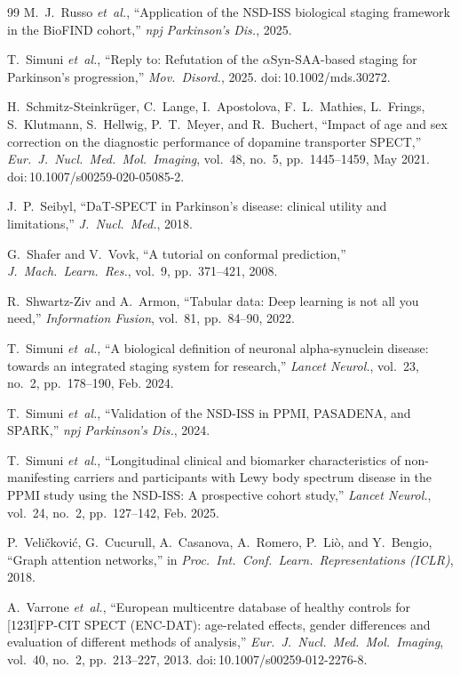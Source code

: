 \begin{thebibliography}{99}
M.~J.~Russo \textit{et~al.}, ``Application of the NSD-ISS biological staging framework in the BioFIND cohort,'' \textit{npj Parkinson's Dis.}, 2025.

T.~Simuni \textit{et~al.}, ``Reply to: Refutation of the $\alpha$Syn-SAA-based staging for Parkinson's progression,'' \textit{Mov.\ Disord.}, 2025. doi:\,10.1002/mds.30272.

H.~Schmitz-Steinkr\"{u}ger, C.~Lange, I.~Apostolova, F.~L.~Mathies, L.~Frings, S.~Klutmann, S.~Hellwig, P.~T.~Meyer, and R.~Buchert, ``Impact of age and sex correction on the diagnostic performance of dopamine transporter SPECT,'' \textit{Eur.\ J.\ Nucl.\ Med.\ Mol.\ Imaging}, vol.~48, no.~5, pp.~1445--1459, May 2021. doi:\,10.1007/s00259-020-05085-2.

J.~P.~Seibyl, ``DaT-SPECT in Parkinson's disease: clinical utility and limitations,'' \textit{J.\ Nucl.\ Med.}, 2018.

G.~Shafer and V.~Vovk, ``A tutorial on conformal prediction,'' \textit{J.\ Mach.\ Learn.\ Res.}, vol.~9, pp.~371--421, 2008.

R.~Shwartz-Ziv and A.~Armon, ``Tabular data: Deep learning is not all you need,'' \textit{Information Fusion}, vol.~81, pp.~84--90, 2022.

T.~Simuni \textit{et~al.}, ``A biological definition of neuronal alpha-synuclein disease: towards an integrated staging system for research,'' \textit{Lancet Neurol.}, vol.~23, no.~2, pp.~178--190, Feb. 2024.

T.~Simuni \textit{et~al.}, ``Validation of the NSD-ISS in PPMI, PASADENA, and SPARK,'' \textit{npj Parkinson's Dis.}, 2024.

T.~Simuni \textit{et~al.}, ``Longitudinal clinical and biomarker characteristics of non-manifesting carriers and participants with Lewy body spectrum disease in the PPMI study using the NSD-ISS: A prospective cohort study,'' \textit{Lancet Neurol.}, vol.~24, no.~2, pp.~127--142, Feb. 2025.

P.~Veli\v{c}kovi\'{c}, G.~Cucurull, A.~Casanova, A.~Romero, P.~Li\`{o}, and Y.~Bengio, ``Graph attention networks,'' in \textit{Proc.\ Int.\ Conf.\ Learn.\ Representations (ICLR)}, 2018.

A.~Varrone \textit{et~al.}, ``European multicentre database of healthy controls for [123I]FP-CIT SPECT (ENC-DAT): age-related effects, gender differences and evaluation of different methods of analysis,'' \textit{Eur.\ J.\ Nucl.\ Med.\ Mol.\ Imaging}, vol.~40, no.~2, pp.~213--227, 2013. doi:\,10.1007/s00259-012-2276-8.


\end{thebibliography}
